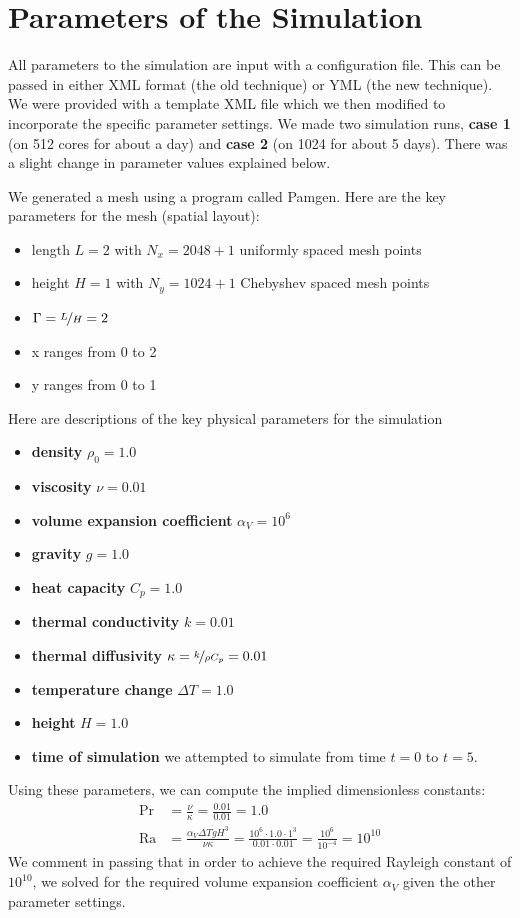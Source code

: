 \documentclass[11pt]{article} %
\begin{document}
\section{Parameters of the Simulation}
All parameters to the simulation are input with a configuration file.
This can be passed in either XML format (the old technique) or YML (the new technique).
We were provided with a template XML file which we then modified to incorporate the 
specific parameter settings.
We made two simulation runs, \textbf{case 1} (on 512 cores for about a day)
and \textbf{case 2} (on 1024 for about 5 days).  
There was a slight change in parameter values explained below.

We generated a mesh using a program called Pamgen.  Here are the key parameters for the mesh (spatial layout):
\begin{itemize}
\item{length} $L=2$  with $N_x = 2048 + 1$ uniformly spaced mesh points
\item{height} $H=1$ with $N_y = 1024 + 1$ Chebyshev spaced mesh points
\item{$\Gamma = \nicefrac{L}{H} = 2$}
\item{x} ranges from 0 to 2
\item{y} ranges from 0 to 1
\end{itemize}

Here are descriptions of the key physical parameters for the simulation
\begin{itemize}
\item{\textbf{density}} $\rho_0 = 1.0$
\item{\textbf{viscosity}} $\nu = 0.01$
\item{\textbf{volume expansion coefficient}} $\alpha_V = 10^6$
\item{\textbf{gravity}} $g = 1.0$
\item{\textbf{heat capacity}} $C_p = 1.0$
\item{\textbf{thermal conductivity}} $k = 0.01$
\item{\textbf{thermal diffusivity}} $\kappa = \nicefrac{k}{\rho C_p} = 0.01$
\item{\textbf{temperature change}} $\Delta T = 1.0$ 
\item{\textbf{height}} $H = 1.0$
\item{\textbf{time of simulation}} we attempted to simulate from time $t=0$ to $t=5$.
\end{itemize}

Using these parameters, we can compute the implied dimensionless constants:
\begin{align}
\textrm{Pr} &= \frac{\nu}{\kappa} = \frac{0.01}{0.01} = 1.0 \\
\textrm{Ra} &= \frac{\alpha_V \Delta T g H^3}{\nu \kappa} = \frac{10^{6} \cdot 1.0 \cdot 1^3}{0.01 \cdot 0.01} = \frac{10^{6}}{10^{-4}} = 10^{10}
\end{align}
We comment in passing that in order to achieve the required Rayleigh constant of $10^{10}$, 
we solved for the required volume expansion coefficient $\alpha_V$ given the other parameter settings.
\end{document}
